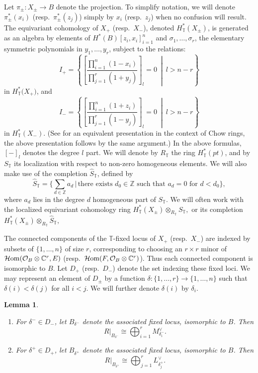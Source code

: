 \documentclass[pdftex]{sigma}
\newtheorem{Lemma}[Theorem]{Lemma}
\numberwithin{equation}{section}
\newcommand{\cc}[1]{\mathcal{#1}} %
\newcommand{\CC}{\mathbb{C}}
\newcommand{\ZZ}{\mathbb{Z}}
\newcommand{\torus}{\mathbb{T}}
\newcommand{\F}{F}
\newcommand{\E}{E}
\newcommand{\MB}{M}
\newcommand{\LB}{L}
\newcommand{\z}{z}
\newcommand{\x}{x}
\newcommand{\y}{y}
\begin{document}
Let
$\pi_{\pm}\colon X_\pm \to B$ denote the projection. To simplify notation, we will denote $\pi_\pm^*(x_i)$ (resp.\ $\pi_\pm^*(z_j)$) simply by $x_i$ (resp.\ $z_j$) when no confusion will result.
The equivariant cohomology of $X_+$ (resp.\ $X_-$), denoted $H^*_\torus(X_{\pm})$, is generated as an algebra by elements of
$H^*(B)[\z_i, \x_i]_{i=1}^n$
and $\sigma_1, \dots, \sigma_r$, the elementary symmetric polynomials in $\y_1, \dots , \y_r$, subject to the relations:
\begin{equation*}%
I_+ = \left\{ \left[ \frac{\prod_{i=1}^n(1 - \x_i)}{\prod_{j=1}^r (1 + \y_j)}\right]_{l} = 0\ \middle| \ l> n-r \right\}
\end{equation*}
in $H^*_\torus\bigl(X_+\bigr)$, and
\begin{equation*}%
I_- = \left\{ \left[ \frac{\prod_{i=1}^n(1 + \z_i)}{\prod_{j=1}^r (1 - \y_j)}\right]_{l} = 0 \ \middle| \ l> n-r \right\}
\end{equation*}
in $H^*_\torus(X_-)$. (See \cite[Example 14.6.6]{Fulton} for an equivalent presentation in the context of Chow rings, the above presentation follows by the same argument.) In the above formulas, $\left[ - \right]_{l}$ denotes the degree $l$ part. We will denote by $R_\torus$ the ring $H^*_\torus(pt)$, and by $S_\torus$ its localization with respect to non-zero homogeneous elements. We will also make use of the completion
$\hat S_\torus$, defined by
\[
\hat S_\torus = \biggl\{ \sum_{d \in \ZZ} a_d \, \bigg| \, \text{there exists $d_0 \in \ZZ$ such that $a_d = 0$ for $d < d_0$}\biggr\},
\]
where $a_d$ lies in the degree $d$ homogeneous part of $S_\torus.$
We will often work with the localized equivariant cohomology ring $H^*_\torus(X_\pm) \otimes_{R_\torus} S_\torus,$ or its completion $H^*_\torus(X_\pm) \otimes_{R_\torus} \hat S_\torus,$


The connected components of the $\torus$-fixed locus of $X_+$ (resp.\ $X_-$) are indexed by subsets of $\{1, \dots, n\}$ of size $r$, corresponding to choosing an $r \times r$ minor of $\mathcal{H}{\rm om}(\cc O_B \otimes \CC^r, \E)$ (resp.\ $\mathcal{H}{\rm om}(\F, \cc O_B \otimes \CC^r)$). Thus each connected component is isomorphic to $B$. Let $D_{+}$ (resp.\ $D_{-}$) denote the set indexing these fixed loci.
We may represent an element of $D_\pm$ by a function $\delta\colon \{1, \dots, r\} \to \{1, \dots, n\}$ such that
$\delta(i)<\delta(j)$ for all $i<j$.
 We will further denote $\delta(i)$ by $\delta_i$.



\begin{Lemma}\label{l:rest}\quad
\begin{enumerate}\itemsep=0pt\itemsep=0pt
\item[$1.$] For $\delta^- \in D_{-}$, let $B_{\delta^-} $ denote the associated fixed locus, isomorphic to $B$. Then
\[ R|_{B_{\delta^-}} \cong \bigoplus_{i=1}^r \MB_{\delta^-_i}^\vee.\]
\item[$2.$] For $\delta^+ \in D_{+}$, let $B_{\delta^+} $ denote the associated fixed locus, isomorphic to $B$. Then
\[R|_{B_{\delta^+}} \cong \bigoplus_{j=1}^r \LB_{\delta^+_j}^\vee.\]
\end{enumerate}
\end{Lemma}
\end{document}
